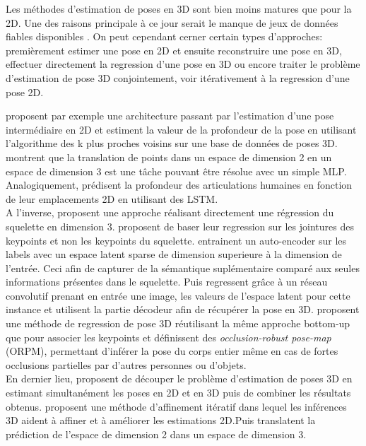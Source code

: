 Les méthodes d'estimation de poses en 3D sont bien moins matures que pour la 2D. Une des raisons principale à ce jour serait le manque de jeux de données fiables disponibles \cite{2018arXiv180309722Y}.
On peut cependant cerner certain types d'approches: premièrement estimer une pose en 2D et ensuite reconstruire une pose en 3D, effectuer directement la regression d'une pose en 3D ou encore traiter le problème d'estimation de pose 3D conjointement, voir itérativement à la regression d'une pose 2D.


\cite{2016arXiv161206524C} proposent par exemple une architecture passant par l'estimation d'une pose intermédiaire en 2D et estiment la valeur de la profondeur de la pose en utilisant l'algorithme des k plus proches voisins sur une base de données de poses 3D.
\cite{martinez2017simple} montrent que la translation de points dans un espace de dimension 2 en un espace de dimension 3 est une tâche pouvant être résolue avec un simple MLP.
Analogiquement, \cite{nie2017monocular} prédisent la profondeur des articulations humaines en fonction de leur emplacements 2D en utilisant des LSTM.\\

A l'inverse, \cite{li20143d} proposent une approche réalisant directement une régression du squelette en dimension 3. \cite{sun2017compositional} proposent de baser leur regression sur les jointures des keypoints et non les keypoints du squelette.
\cite{tekin2016structured} entrainent un auto-encoder sur les labels avec un espace latent sparse de dimension superieure à la dimension de l'entrée. Ceci afin de capturer de la sémantique suplémentaire comparé aux seules informations présentes dans le squelette. Puis regressent grâce à un réseau convolutif prenant en entrée une image, les valeurs de l'espace latent pour cette instance et utilisent la partie décodeur afin de récupérer la pose en 3D.\cite{singleshotmultiperson2018} proposent une  méthode de regression de pose 3D réutilisant la même approche bottom-up que \cite{cao2017realtime} pour associer les keypoints et définissent des \textit{occlusion-robust pose-map} (ORPM), permettant d'inférer la pose du corps entier même en cas de fortes occlusions partielles par d'autres personnes ou d'objets.\\

En dernier lieu, \cite{simo2013joint} proposent de découper le problème d'estimation de poses 3D en estimant simultanément les poses en 2D et en 3D puis de combiner les résultats obtenus. \cite{tome2017lifting} proposent une méthode d'affinement itératif dans lequel les inférences 3D aident à affiner et à améliorer les estimations 2D.Puis translatent la prédiction de l'espace de dimension 2 dans un espace de dimension 3. \cite{rogez2019lcr}

